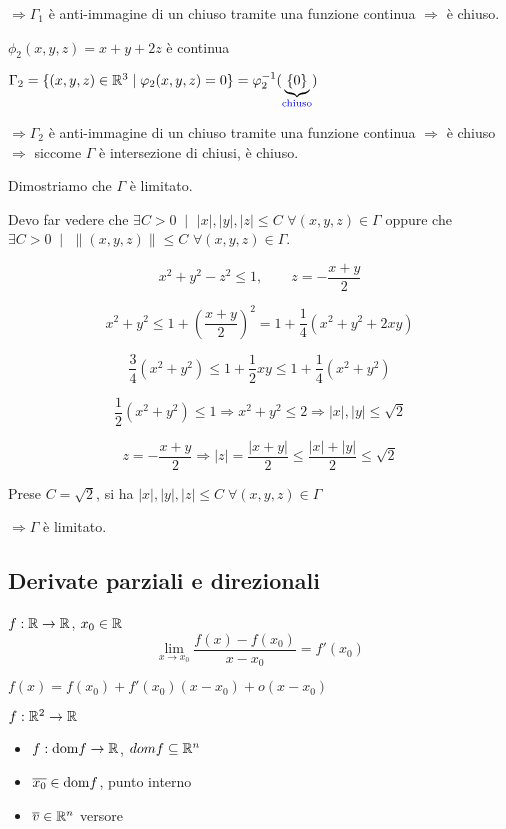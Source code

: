 \begin{exbar}
\begin{example}
	$\Rightarrow \Gamma_1$ è anti-immagine di un chiuso tramite una funzione continua $\Rightarrow$ è chiuso.
	\begin{center}	
		$\phi_2(x,y,z)=x+y+2z$ è continua
	
		$\Gamma_2=\{(x,y,z)\in\mathbb{R}^3\mid \varphi_2(x,y,z)= 0\}=\varphi_2^{-1}(\underbrace{\{0\}}_{{\color{blue} \text{chiuso}}})$
	\end{center}
	
	$\Rightarrow\Gamma_2$ è anti-immagine di un chiuso tramite una funzione continua $\Rightarrow$ è chiuso $\Rightarrow$ siccome $\Gamma$ è intersezione di chiusi, è chiuso.
	
	Dimostriamo che $\Gamma $ è limitato.
	
	Devo far vedere che $\exists C>0 \;\mid$ $|x|,|y|,|z|\leq C$ $\forall (x,y,z)\in \Gamma$ oppure che $\exists C>0 \; \mid$ $\|(x,y,z)\|\leq C$ $\forall(x,y,z)\in\Gamma$.
	
	$$x^2+y^2-z^2\leq 1, \qquad z=-\frac{x+y}{2}$$
	
	$$x^2+y^2\leq 1+\left(\frac{x+y}{2}\right)^2=1+\frac{1}{4}(x^2+y^2+2xy)$$
	
	$$\frac{3}{4}(x^2+y^2)\leq 1+\frac{1}{2}xy\leq 1+\frac{1}{4}(x^2+y^2)$$
	
	$$\frac{1}{2}(x^2+y^2)\leq 1\Rightarrow x^2+y^2\leq 2\Rightarrow |x|,|y|\leq \sqrt{2}$$
	
	$$z=-\frac{x+y}{2}\Rightarrow |z|=\frac{|x+y|}{2}\leq \frac{|x|+|y|}{2}\leq \sqrt{2}$$
	
	Prese $C=\sqrt{2}$, si ha $|x|,|y|,|z|\leq C \; \forall(x,y,z)\in \Gamma$
	
	{\centering $\Rightarrow\Gamma$ è limitato. \par}
\end{example}
\end{exbar}


\subsection{Derivate parziali e direzionali}
$f:\mathbb{R}\rightarrow\mathbb{R}$, $x_0\in\mathbb{R}$
\begin{equation*}
	\lim_{x \rightarrow x_0}\frac{f(x)-f(x_0)}{x-x_0}=f'(x_0)
\end{equation*}

$f(x)=f(x_0)+f'(x_0)(x-x_0)+o(x-x_0)$

$f:\mathbb{R}^2\rightarrow\mathbb{R}$

\segnaposto %

\begin{itemize}
	\item $f:\mathrm{dom} f\rightarrow\mathbb{R}$, $domf \subseteq \mathbb{R}^n$
	\item $\overline{x_0}\in \mathrm{dom} f$, punto interno
	\item $\overline{v}\in \mathbb{R}^n$ versore
\end{itemize}

